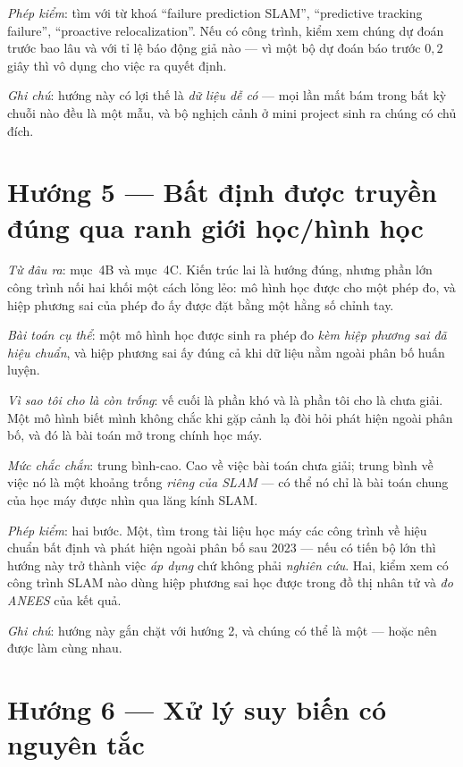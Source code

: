 \documentclass[../../vslam.tex]{subfiles}
\begin{document}
\emph{Phép kiểm}: tìm với từ khoá ``failure prediction SLAM'', ``predictive tracking failure'', ``proactive relocalization''. Nếu có công trình, kiểm xem chúng dự đoán trước bao lâu và với tỉ lệ báo động giả nào --- vì một bộ dự đoán báo trước \(0{,}2\) giây thì vô dụng cho việc ra quyết định.

\emph{Ghi chú}: hướng này có lợi thế là \emph{dữ liệu dễ có} --- mọi lần mất bám trong bất kỳ chuỗi nào đều là một mẫu, và bộ nghịch cảnh ở  mini project sinh ra chúng có chủ đích.

\section{Hướng 5 --- Bất định được truyền đúng qua ranh giới học/hình học}

\emph{Từ đâu ra}:  mục~4B và  mục~4C. Kiến trúc lai là hướng đúng, nhưng phần lớn công trình nối hai khối một cách lỏng lẻo: mô hình học được cho một phép đo, và hiệp phương sai của phép đo ấy được đặt bằng một hằng số chỉnh tay.

\emph{Bài toán cụ thể}: một mô hình học được sinh ra phép đo \emph{kèm hiệp phương sai đã hiệu chuẩn}, và hiệp phương sai ấy đúng cả khi dữ liệu nằm ngoài phân bố huấn luyện.

\emph{Vì sao tôi cho là còn trống}: vế cuối là phần khó và là phần tôi cho là chưa giải. Một mô hình biết mình không chắc khi gặp cảnh lạ đòi hỏi phát hiện ngoài phân bố, và đó là bài toán mở trong chính học máy.

\emph{Mức chắc chắn}: trung bình-cao. Cao về việc bài toán chưa giải; trung bình về việc nó là một khoảng trống \emph{riêng của SLAM} --- có thể nó chỉ là bài toán chung của học máy được nhìn qua lăng kính SLAM.

\emph{Phép kiểm}: hai bước. Một, tìm trong tài liệu học máy các công trình về hiệu chuẩn bất định và phát hiện ngoài phân bố sau 2023 --- nếu có tiến bộ lớn thì hướng này trở thành việc \emph{áp dụng} chứ không phải \emph{nghiên cứu}. Hai, kiểm xem có công trình SLAM nào dùng hiệp phương sai học được trong đồ thị nhân tử và \emph{đo ANEES} của kết quả.

\emph{Ghi chú}: hướng này gắn chặt với hướng 2, và chúng có thể là một --- hoặc nên được làm cùng nhau.

\section{Hướng 6 --- Xử lý suy biến có nguyên tắc}
\end{document}
